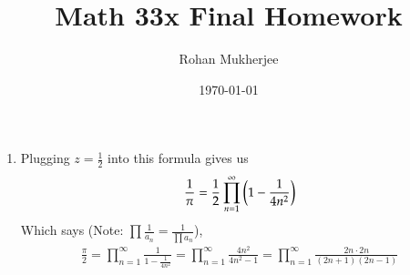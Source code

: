 \documentclass[12pt]{article}
\title{Math 33x Final Homework}
\date{\today}
\author{Rohan Mukherjee}
\theoremstyle{definition}
\theoremstyle{remark}
\begin{document}
	\maketitle
	\begin{enumerate}[leftmargin=\labelsep]
		\item Plugging $z = \frac12$ into this formula gives us
		\begin{align*}
			\frac{1}{\pi} = \frac12 \prod_{n=1}^\infty \qty(1-\frac{1}{4n^2})
		\end{align*}
		Which says (Note: $\prod \frac{1}{a_n} = \frac{1}{\prod a_n}$),
		\begin{align*}
			\frac{\pi}{2} = \prod_{n=1}^\infty \frac{1}{1-\frac{1}{4n^2}} = \prod_{n=1}^\infty \frac{4n^2}{4n^2-1} = \prod_{n=1}^\infty \frac{2n \cdot 2n}{(2n+1)(2n-1)}
		\end{align*}
	

\end{enumerate}
\end{document}
